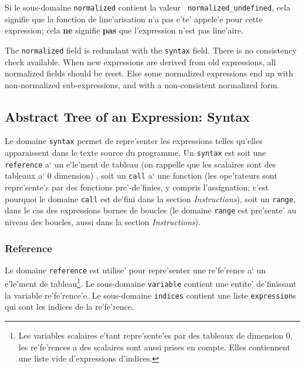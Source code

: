 {Si le sous-domaine {\tt normalized} contient la valeur {\tt
normalized\_undefined}, cela signifie que la fonction de line'arisation
n'a pas e'te' appele'e pour cette expression; cela {\bf ne} signifie
{\bf pas} que l'expression n'est pas line'aire.

The \verb/normalized/ field is redundant with the \verb/syntax/
field. There is no consistency check available. When new expressions are
derived from old expressions, all normalized fields should be
reset. Else some normalized expressions end up with non-normalized
sub-expressions, and with a non-consistent normalized form.


\subsection{Abstract Tree of an Expression: Syntax}
\label{subsection-syntax}

{}

Le domaine \verb/syntax/ permet de repre'senter les expressions telles
qu'elles apparaissent dans le texte source du programme. Un
\verb/syntax/ est soit une \verb/reference/ a` un e'le'ment de tableau
(on rappelle que les scalaires sont des tableaux a` 0 dimension) , soit
un \verb/call/ a` une fonction (les ope'rateurs sont repre'sente's par
des fonctions pre'-de'finies, y compris l'assignation; c'est pourquoi le
domaine {\tt call} est de'fini dans la section {\em Instructions}), soit
un \verb/range/, dans le cas des expressions bornes de boucles (le domaine
{\tt range} est pre'sente' au niveau des boucles, aussi dans la section
{\em Instructions}).


\subsubsection{Reference}
\label{subsubsection-reference}

{
Le domaine \verb/reference/ est utilise' pour repre'senter une
re'fe'rence a` un e'le'ment de tableau\footnote{Les variables scalaires
e'tant repre'sente'es par des tableaux de dimension 0, les re'fe'rences
a des scalaires sont aussi prises en compte. Elles contiennent une liste
vide d'expressions d'indices.}.  Le sous-domaine \verb/variable/
contient une entite' de'finissant la variable re'fe'rence'e. Le
sous-domaine \verb/indices/ contient une liste {\tt expression}s qui sont les
indices de la re'fe'rence.
}

}
